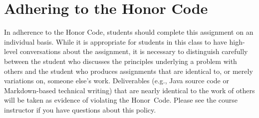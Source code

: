 \documentclass[11pt]{article}
\begin{document}
\section*{Adhering to the Honor Code}

In adherence to the Honor Code, students should complete this assignment on an
individual basis. While it is appropriate for students in this class to have
high-level conversations about the assignment, it is necessary to distinguish
carefully between the student who discusses the principles underlying a problem
with others and the student who produces assignments that are identical to, or
merely variations on, someone else's work. Deliverables (e.g., Java source code
or Markdown-based technical writing) that are nearly identical to the work of
others will be taken as evidence of violating the \mbox{Honor Code}. Please see
the course instructor if you have questions about this policy.
\end{document}
